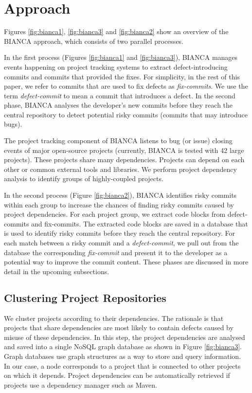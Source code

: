\documentclass[12pt]{report}
\begin{document}
\section{Approach}\label{approach-2}

Figures \ref{fig:bianca1}, \ref{fig:bianca3} and \ref{fig:bianca2} show
an overview of the BIANCA approach, which consists of two parallel
processes.

In the first process (Figures \ref{fig:bianca1} and \ref{fig:bianca3}),
BIANCA manages events happening on project tracking systems to extract
defect-introducing commits and commits that provided the fixes. For
simplicity, in the rest of this paper, we refer to commits that are used
to fix defects as \emph{fix-commits}. We use the term
\emph{defect-commit} to mean a commit that introduces a defect. In the
second phase, BIANCA analyses the developer's new commits before they
reach the central repository to detect potential risky commits (commits
that may introduce bugs).



The project tracking component of BIANCA listens to bug (or issue)
closing events of major open-source projects (currently, BIANCA is
tested with 42 large projects). These projects share many dependencies.
Projects can depend on each other or common external tools and
libraries. We perform project dependency analysis to identify groups of
highly-coupled projects.

In the second process (Figure \ref{fig:bianca2}), BIANCA identifies
risky commits within each group to increase the chances of finding risky
commits caused by project dependencies. For each project group, we
extract code blocks from defect-commits and fix-commits. The extracted
code blocks are saved in a database that is used to identify risky
commits before they reach the central repository. For each match between
a risky commit and a \emph{defect-commit}, we pull out from the database
the corresponding \emph{fix-commit} and present it to the developer as a
potential way to improve the commit content. These phases are discussed
in more detail in the upcoming subsections.

\subsection{Clustering Project Repositories}\label{sec:clustering}

We cluster projects according to their dependencies. The rationale is
that projects that share dependencies are most likely to contain defects
caused by misuse of these dependencies. In this step, the project
dependencies are analysed and saved into a single NoSQL graph database
as shown in Figure \ref{fig:bianca3}. Graph databases use graph
structures as a way to store and query information. In our case, a node
corresponds to a project that is connected to other projects on which it
depends. Project dependencies can be automatically retrieved if projects
use a dependency manager such as Maven.
\end{document}
